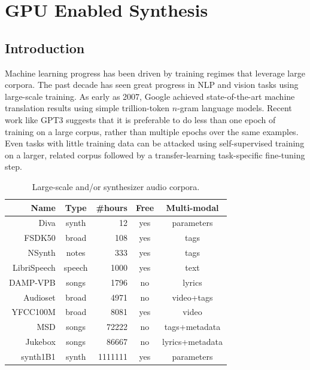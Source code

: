 \graphicspath{{./}{./figures/}{./figures/6/}}

\chapter{GPU Enabled Synthesis}

\section{Introduction}
\label{sec:intro}

Machine learning progress has been driven by training regimes that leverage large corpora. The past decade has seen great progress in NLP and vision tasks using large-scale training. As early as 2007, Google \cite{brants-etal-2007-large} achieved state-of-the-art machine translation results using simple trillion-token $n$-gram language models.
Recent work like GPT3 \cite{NEURIPS2020_1457c0d6} suggests that it is preferable to do less than one epoch of training on a large corpus, rather than multiple epochs over the same examples. Even tasks with little training data can be attacked using self-supervised training on a larger, related corpus followed by a transfer-learning task-specific fine-tuning step.

\begin{table}[thb]
\begin{center}
\begin{tabular}{r|c|r|c|c}
Name & Type & \#hours & Free & Multi-modal \\
\hline
Diva \cite{esling2020flow} & synth & 12 & yes & parameters \\
FSDK50 \cite{fonseca2020fsd50k} & broad & 108 & yes & tags \\
NSynth \cite{engel2017neural} & notes & 333 & yes & tags \\
LibriSpeech \cite{librispeech} & speech & 1000 & yes & text \\ 
DAMP-VPB \cite{smule_inc_2017_2616690} & songs & 1796 & no & lyrics \\
Audioset \cite{45857} & broad & 4971 & no & video+tags \\ 
YFCC100M \cite{thomee2016yfcc100m} & broad & 8081 & yes & video \\
MSD \cite{bertin2011million} & songs & 72222 & no & tags+metadata \\
Jukebox \cite{dhariwal2020jukebox} & songs & 86667 & no & {\footnotesize lyrics+metadata}\\
synth1B1 & synth & 1111111 & yes & parameters \\
\end{tabular}
\end{center}
\caption{Large-scale and/or synthesizer audio corpora.}
\label{tbl:audio-corpora}
\end{table}

